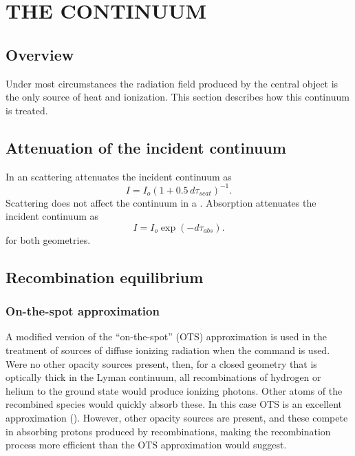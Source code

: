 \chapter{THE CONTINUUM}

\section{Overview}

Under most circumstances the radiation field produced by the central object
is the only source of heat and ionization.
This section describes how this
continuum is treated.

\section{Attenuation of the incident continuum}

In an  scattering attenuates the incident continuum as
\begin{equation}
I = {I_o}{\left( {1 + 0.5\,d{\tau _{scat}}} \right)^{ - 1}}.
\end{equation}
Scattering does not affect the continuum in a .
Absorption attenuates the incident continuum as
\begin{equation}
I = {I_o}\exp ( - d{\tau _{abs}}).%
\end{equation}
for both geometries.

\section{Recombination equilibrium}

\subsection{On-the-spot approximation}

A modified version of the ``on-the-spot'' (OTS) approximation is used
in the treatment of sources of diffuse ionizing radiation when the  command is used.
Were no other opacity sources present, then, for a
closed geometry that is optically thick in the Lyman continuum, all
recombinations of hydrogen or helium to the ground state would produce
ionizing photons.
Other atoms of the recombined species would quickly absorb
these.
In this case OTS is an excellent approximation (\citealp{VanBlerkom1967,Baessgen1988}).
However, other
opacity sources are present, and these compete in absorbing protons produced
by recombinations, making the recombination process more efficient than
the OTS approximation would suggest.

